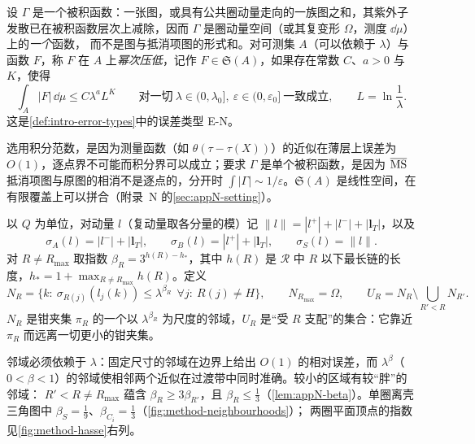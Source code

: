 \begin{definition}[积分范数意义下的幂次压低]\label{def:method-power-suppressed}
设 $\Gamma$ 是一个被积函数：一张图，或具有公共圈动量走向的一族图之和，其紫外子发散已在被积函数层次上减除，因而 $\Gamma$ 是圈动量空间（或其复变形 $\Omega$，测度 $\dd\mu$）上的\emph{一个}函数，
而不是图与抵消项图的形式和。对可测集 $A$（可以依赖于 $\lambda$）与函数 $F$，称 $F$ 在 $A$ 上\emph{幂次压低}，记作 $F\in\mathfrak S(A)$，如果存在常数 $C$、$a>0$ 与 $K$，使得
\begin{equation}\label{eq:method-EN}
\int_A|F|\,\dd\mu\le C\lambda^aL^K\qquad\text{对一切}\ \lambda\in(0,\lambda_0],\ \varepsilon\in(0,\varepsilon_0]\ \text{一致成立},\qquad L=\ln\frac1\lambda .
\end{equation}
这是\cref{def:intro-error-types}中的误差类型 E-N。
\end{definition}

选用积分范数，是因为测量函数（如 $\theta(\tau-\tau(X))$）的近似在薄层上误差为 $O(1)$，逐点界不可能而积分界可以成立；要求 $\Gamma$ 是单个被积函数，是因为
$\overline{\rm MS}$ 抵消项图与原图的相消不是逐点的，分开时 $\int|\Gamma|\sim1/\varepsilon$。$\mathfrak S(A)$ 是线性空间，在有限覆盖上可以拼合（附录~N 的\cref{sec:appN-setting}）。

\begin{definition}\label{def:method-neighbourhoods}
以 $Q$ 为单位，对动量 $l$（复动量取各分量的模）记 $\|l\|=|l^+|+|l^-|+|\mathbf l_T|$，以及
\begin{equation}\label{eq:method-sigma}
\sigma_A(l)=|l^-|+|\mathbf l_T|,\qquad \sigma_B(l)=|l^+|+|\mathbf l_T|,\qquad \sigma_S(l)=\|l\| .
\end{equation}
对 $R\neq R_{\max}$ 取指数 $\beta_R=3^{h(R)-h_*}$，其中 $h(R)$ 是 $\mathcal R$ 中 $R$ 以下最长链的长度，$h_*=1+\max_{R\ne R_{\max}}h(R)$。定义
\begin{equation}\label{eq:method-NU}
N_R=\bigl\{k:\ \sigma_{R(j)}(l_j(k))\le\lambda^{\beta_R}\ \ \forall j:\ R(j)\neq H\bigr\},\qquad N_{R_{\max}}=\Omega,\qquad U_R=N_R\setminus\bigcup_{R'<R}N_{R'} .
\end{equation}
$N_R$ 是钳夹集 $\pi_R$ 的一个以 $\lambda^{\beta_R}$ 为尺度的邻域，$U_R$ 是“受 $R$ 支配”的集合：它靠近 $\pi_R$ 而远离一切更小的钳夹集。
\end{definition}

邻域必须依赖于 $\lambda$：固定尺寸的邻域在边界上给出 $O(1)$ 的相对误差，而 $\lambda^\beta$（$0<\beta<1$）的邻域使相邻两个近似在过渡带中同时准确。较小的区域有较“胖”的邻域：
$R'<R\neq R_{\max}$ 蕴含 $\beta_R\ge3\beta_{R'}$，且 $\beta_R\le\frac13$（\cref{lem:appN-beta}）。单圈离壳三角图中 $\beta_S=\frac19$、$\beta_{C_i}=\frac13$（\cref{fig:method-neighbourhoods}）；
两圈平面顶点的指数见\cref{fig:method-hasse}右列。

